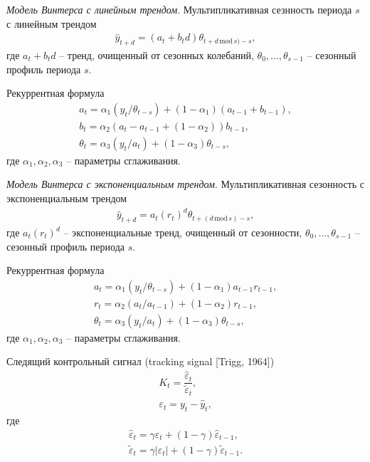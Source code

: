 \documentclass[%
	11pt,
	a4paper,
	utf8,
		]{article}
\begin{document}
\emph{Модель Винтерса с линейным трендом}. Мультипликативная сезнность периода $ s $ с линейным трендом
\begin{align*}
	\hat{y}_{t + d} = (a_t + b_t d) \theta_{t + d \, \text{mod} \, s) - s},
\end{align*} 
где $ a_t +b_t d $ -- тренд, очищенный от сезонных колебаний, $ \theta_0, \ldots, \theta_{s - 1} $ -- сезонный профиль периода $ s $.

Рекуррентная формула
\begin{align*}
	a_t = \alpha_1 (y_t / \theta_{t - s}) + (1 - \alpha_1)(a_{t - 1} + b_{t - 1}),\\
	b_t = \alpha_2 (a_t - a_{t - 1} + (1 - \alpha_2)) b_{t - 1}, \\
	\theta_t = \alpha_3 (y_t / a_t) + (1 - \alpha_3) \theta_{t - s},
\end{align*}
где $ \alpha_1, \alpha_2, \alpha_3 $ -- параметры сглаживания.

\emph{Модель Винтерса с экспоненциальным трендом}. Мультипликативная сезонность с экспоненциальным трендом
\begin{align*}
	\hat{y}_{t + d} = a_t (r_t)^d \theta_{t + (d \, \text{mod} \, s) - s},
\end{align*}
где $ a_t(r_t)^d $ -- экспоненциальные тренд, очищенный от сезонности, $ \theta_0, \ldots, \theta_{s - 1} $ -- сезонный профиль периода $ s $.

Рекуррентная формула
\begin{align*}
	a_t = \alpha_1 (y_t / \theta_{t - s}) + (1 - \alpha_1) a_{t - 1} r_{t - 1},\\
	r_t = \alpha_2 (a_t / a_{t - 1}) + (1 - \alpha_2) r_{t - 1}, \\
	\theta_t = \alpha_3 (y_t / a_t) + (1 - \alpha_3) \theta_{t - s},
\end{align*}
где $ \alpha_1, \alpha_2, \alpha_3 $ -- параметры сглаживания.

Следящий контрольный сигнал (tracking signal [Trigg, 1964])
\begin{align*}
	K_t = \dfrac{\hat{\varepsilon}_t}{\tilde{\varepsilon}_t},\\
	\varepsilon_t = y_t - \hat{y}_t,
\end{align*}
где
\begin{align*}
	\hat{\varepsilon}_t = \gamma \varepsilon_t + (1 - \gamma) \hat{\varepsilon}_{t - 1},\\
	\tilde{\varepsilon}_t = \gamma |\varepsilon_t| + (1 - \gamma) \tilde{\varepsilon}_{t - 1}.
\end{align*}
\end{document}
